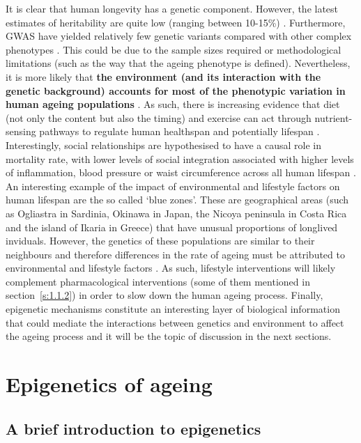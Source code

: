 \bigskip

It is clear that human longevity has a genetic component. However, the latest estimates of heritability are quite low (ranging between 10-15\%) \cite{Ruby2018a,Kaplanis2018}. Furthermore, \acrshort{GWAS} have yielded relatively few genetic variants compared with other complex phenotypes \cite{Singh2019}. This could be due to the sample sizes required or methodological limitations (such as the way that the ageing phenotype is defined). Nevertheless, it is more likely that \textbf{the environment (and its interaction with the genetic background) accounts for most of the phenotypic variation in human ageing populations} \cite{Singh2019,Partridge2018}. As such, there is increasing evidence that diet (not only the content but also the timing) and exercise can act through nutrient-sensing pathways to regulate human healthspan and potentially lifespan \cite{Singh2019,Partridge2018,Redman2018,Wei2017,Richter2009,Most2017}. Interestingly, social relationships are hypothesised to have a causal role in mortality rate, with lower levels of social integration associated with higher levels of inflammation, blood pressure or waist circumference across all human lifespan \cite{Yang2016a}. An interesting example of the impact of environmental and lifestyle factors on human lifespan are the so called `blue zones'. These are geographical areas (such as Ogliastra in Sardinia, Okinawa in Japan, the Nicoya peninsula in Costa Rica and the island of Ikaria in Greece) that have unusual proportions of longlived inviduals. However, the genetics of these populations are similar to their neighbours and therefore differences in the rate of ageing must be attributed to environmental and lifestyle factors \cite{Partridge2018,Poulain2013}. As such, lifestyle interventions will likely complement pharmacological interventions (some of them mentioned in section~\ref{s:1.1.2}) in order to slow down the human ageing process. Finally, epigenetic mechanisms constitute an interesting layer of biological information that could mediate the interactions between genetics and environment to affect the ageing process and it will be the topic of discussion in the next sections.

\smallskip

\section{Epigenetics of ageing}

\subsection{A brief introduction to epigenetics}

